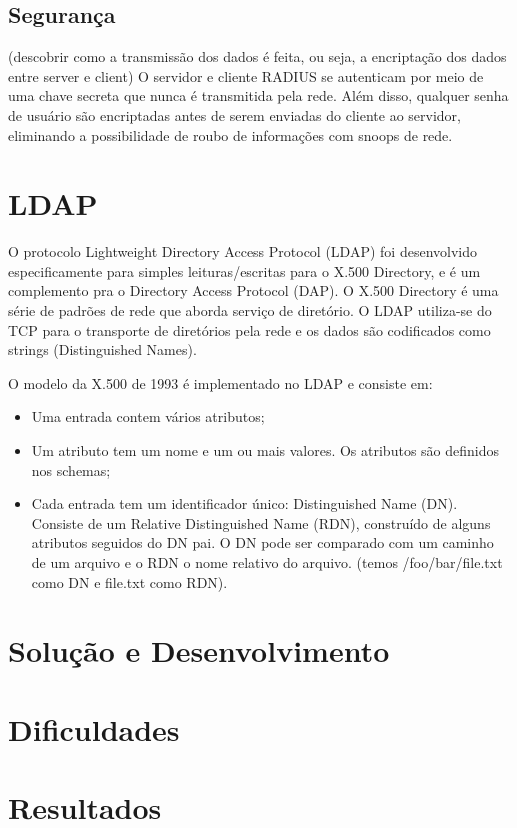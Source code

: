 \subsection{Segurança}

(descobrir como a transmissão dos dados é feita, ou seja, a encriptação dos dados entre
server e client)
O servidor e cliente RADIUS se autenticam por meio de uma chave secreta que nunca é
transmitida pela rede. Além disso, qualquer senha de usuário são encriptadas antes de
serem enviadas do cliente ao servidor, eliminando a possibilidade de roubo de informações
com snoops de rede.

\section{LDAP}

O protocolo Lightweight Directory Access Protocol (LDAP) foi desenvolvido especificamente
para simples leituras/escritas para o X.500 Directory, e é um complemento pra o Directory
Access Protocol (DAP). O X.500 Directory é uma série de padrões de rede que aborda serviço
de diretório. O LDAP utiliza-se do TCP para o transporte de diretórios pela rede e os dados
são codificados como strings (Distinguished Names).

O modelo da X.500 de 1993 é implementado no LDAP e consiste em:
\begin{itemize}
  \item Uma entrada contem vários atributos;
  \item Um atributo tem um nome e um ou mais valores. Os atributos são definidos nos schemas;
  \item Cada entrada tem um identificador único: Distinguished Name (DN). Consiste de um
    Relative Distinguished Name (RDN), construído de alguns atributos seguidos do DN pai.
    O DN pode ser comparado com um caminho de um arquivo e o RDN o nome relativo do arquivo.
    (temos /foo/bar/file.txt como DN e file.txt como RDN).
\end{itemize}

\section{Solução e Desenvolvimento}

\section{Dificuldades}

\section{Resultados}

